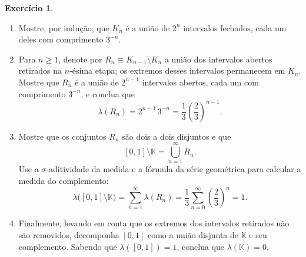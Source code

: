 \documentclass[12pt,portuguese]{article}
\theoremstyle{definition}
\theoremstyle{plainexercise}
\newtheorem{exercise}{Exercício}
\theoremstyle{starredexercise}
\theoremstyle{definition}
\begin{document}
\begin{exercise}
\begin{enumerate}[label=\alph*)]
  \item Mostre, por indução, que $K_n$ é a união de $2^n$ intervalos fechados,
  cada um deles com comprimento $3^{-n}$.

  \item Para $n\geqslant 1$, denote por $R_n\equiv K_{n-1}\setminus K_n$
  a união dos intervalos abertos retirados na $n$-ésima etapa; os extremos
  desses intervalos permanecem em $K_n$. Mostre que $R_n$ é a
  união de $2^{n-1}$ intervalos abertos, cada um com comprimento $3^{-n}$, e
  conclua que
  \[
    \lambda(R_n)=2^{n-1}\,3^{-n}
    =\frac{1}{3}\left(\frac{2}{3}\right)^{n-1}.
  \]

  \item Mostre que os conjuntos $R_n$ são dois a dois disjuntos e que
  \[
    [0,1]\setminus\mathbb{K}=\bigcup_{n=1}^{\infty}R_n.
  \]
  Use a $\sigma$-aditividade da medida e a fórmula da série geométrica para
  calcular a medida do complemento:
  \[
    \lambda\bigl([0,1]\setminus\mathbb{K}\bigr)
    =\sum_{n=1}^{\infty}\lambda(R_n)
    =\frac{1}{3}\sum_{n=0}^{\infty}\left(\frac{2}{3}\right)^n
    =1.
  \]

  \item Finalmente, levando em conta que os extremos dos intervalos retirados
  não são removidos, decomponha $[0,1]$ como a união disjunta de $\mathbb{K}$ e
  seu complemento. Sabendo que $\lambda([0,1])=1$, conclua que
  $\lambda(\mathbb{K})=0$.
\end{enumerate}
\end{exercise}
\end{document}
